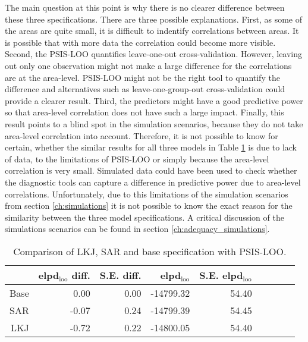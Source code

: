 The main question at this point is why there is no clearer difference between these three specifications.
There are three possible explanations.
First, as some of the areas are quite small, it is difficult to indentify correlations between areas.
It is possible that with more data the correlation could become more visible.
Second, the PSIS-LOO quantifies leave-one-out cross-validation.
However, leaving out only one observation might not make a large difference for the correlations are at the area-level.
PSIS-LOO might not be the right tool to quantify the difference and alternatives such as leave-one-group-out cross-validation could provide a clearer result.
Third, the predictors might have a good predictive power so that area-level correlation does not have such a large impact.
Finally, this result points to a blind spot in the simulation scenarios, because they do not take area-level correlation into account.
Therefore, it is not possible to know for certain, whether the similar results for all three models in Table \ref{tab:lkj_sar_base} is due to lack of data, to the limitations of PSIS-LOO or simply because the area-level correlation is very small.
Simulated data could have been used to check whether the diagnostic tools can capture a difference in predictive power due to area-level correlations.
Unfortunately, due to this limitations of the simulation scenarios from section \ref{ch:simulations} it is not possible to know the exact reason for the similarity between the three model specifications.
A critical discussion of the simulations scenarios can be found in section \ref{ch:adequacy_simulations}.

\begin{table}[ht]
    \centering
    \caption{Comparison of LKJ, SAR and base specification with PSIS-LOO.}
    \begin{tabular}{rrrrrrrrr}
        \hline
        & elpd$_{\text{loo}}$ diff. & S.E. diff. & elpd$_{\text{loo}}$ & S.E. elpd$_{\text{loo}}$  \\
        \hline
        Base & 0.00 & 0.00 & -14799.32 & 54.40  \\
        SAR & -0.07 & 0.24 & -14799.39 & 54.45  \\
        LKJ & -0.72 & 0.22 & -14800.05 & 54.40  \\
        \hline
    \end{tabular}

    \label{tab:lkj_sar_base}
\end{table}


